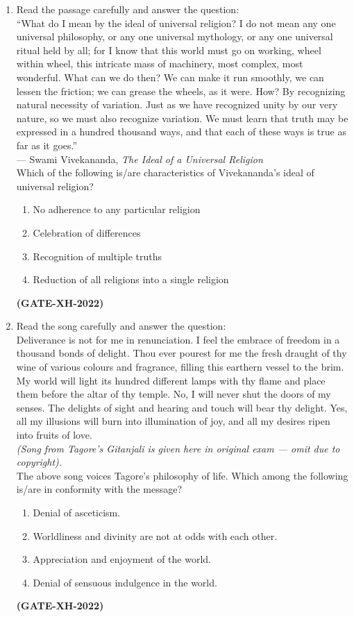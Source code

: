 \documentclass[journal]{IEEEtran}
\begin{document}
\begin{enumerate}
\item Read the passage carefully and answer the question:\\
“What do I mean by the ideal of universal religion? I do not mean any one universal philosophy, or any one universal mythology, or any one universal ritual held by all; for I know that this world must go on working, wheel within wheel, this intricate mass of machinery, most complex, most wonderful. What can we do then? We can make it run smoothly, we can lessen the friction; we can grease the wheels, as it were. How? By recognizing natural necessity of variation. Just as we have recognized unity by our very nature, so we must also recognize variation. We must learn that truth may be expressed in a hundred thousand ways, and that each of these ways is true as far as it goes.”\\
\hfill --- Swami Vivekananda, \textit{The Ideal of a Universal Religion}\\
Which of the following is/are characteristics of Vivekananda’s ideal of universal religion?
\begin{enumerate}
\item No adherence to any particular religion  
\item Celebration of differences  
\item Recognition of multiple truths  
\item Reduction of all religions into a single religion  
\end{enumerate}
\hfill\textbf{(GATE-XH-2022)}

\item Read the song carefully and answer the question: \\ 
Deliverance is not for me in renunciation. I feel the embrace of
freedom in a thousand bonds of delight.
Thou ever pourest for me the fresh draught of thy wine of various
colours and fragrance, filling this earthern vessel to the brim.
My world will light its hundred different lamps with thy flame and
place them before the altar of thy temple.
No, I will never shut the doors of my senses. The delights of sight
and hearing and touch will bear thy delight.
Yes, all my illusions will burn into illumination of joy, and all my
desires ripen into fruits of love.\\
\textit{(Song from Tagore’s Gitanjali is given here in original exam — omit due to copyright).}\\
The above song voices Tagore’s philosophy of life. Which among the following is/are in conformity with the message?
\begin{enumerate}
\item Denial of asceticism.  
\item Worldliness and divinity are not at odds with each other.  
\item Appreciation and enjoyment of the world.  
\item Denial of sensuous indulgence in the world.  
\end{enumerate}
\hfill\textbf{(GATE-XH-2022)}
\newpage

\end{enumerate}
\end{document}
